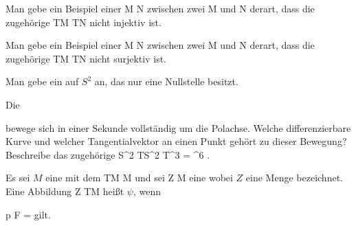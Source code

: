 {}
{

Man gebe ein Beispiel einer
\maabbdisp {\varphi} { M } { N
} {}
zwischen zwei
\mathkor {} {M} {und} {N} {}
derart, dass die zugehörige
 {TM} {TN
} {}
nicht injektiv ist.

}
{} {}

{}
{

Man gebe ein Beispiel einer
\maabbdisp {\varphi} { M } { N
} {}
zwischen zwei
\mathkor {} {M} {und} {N} {}
derart, dass die zugehörige
 {TM} {TN
} {}
nicht surjektiv ist.

}
{} {}

{}
{

Man gebe ein
 
auf $S^2$ an, das nur eine Nullstelle besitzt.

}
{} {}

{}
{

Die

 bewege sich in einer Sekunde vollständig
 {} {}
um die Polachse. Welche differenzierbare Kurve und welcher Tangentialvektor an einen Punkt
 gehört zu dieser Bewegung? Beschreibe das zugehörige
\maabbdisp {} {S^2} {TS^2 \subseteq T\R^3 = \R^6
} {.}

}
{} {}

Es sei $M$ eine
mit dem
 {TM} {M
} {}
und sei
\maabbdisp {\psi} { Z } { M
} {}
eine
wobei $Z$ eine Menge bezeichnet. Eine Abbildung
 { Z } { TM
} {}
heißt
$\psi$, wenn

\mavergleichskette
{\vergleichskette
{ p \circ F
}
{ = }{ \psi
}
{  }{
}
{    }{
}
{   }{
}
}
{}{}{}
gilt.



